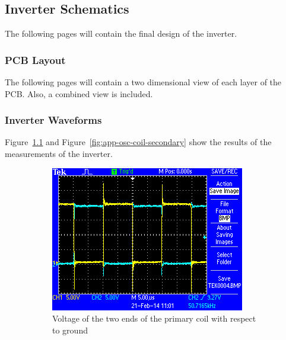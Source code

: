 \documentclass[11pt,titlepage]{report}
\begin{document}
\begin{appendices}
\chapter{Inverter Schematics}
\label{app:schematics}
The following pages will contain the final design of the inverter.

\subsection{PCB Layout}
\label{app:pcb_layout}
The following pages will contain a two dimensional view of each layer of the PCB. Also, a combined view is included.

\subsection{Inverter Waveforms}
Figure~\ref{fig:app-osc-coil-primary} and Figure~\ref{fig:app-osc-coil-secondary} show the results of the measurements of the inverter.
\label{app:waveforms}
\begin{figure}[H]
	\begin{center}
		\begin{subfigure}[h]{0.48\textwidth}
			\includegraphics[width=\textwidth]{resources/osc-coil-primary.png}
			\caption{Voltage of the two ends of the primary coil with respect to ground}
			\label{fig:app-osc-coil-primary}
		\end{subfigure}
		\quad
		\begin{subfigure}[h]{0.48\textwidth}

\end{subfigure}
\end{center}
\end{figure}
\end{appendices}
\end{document}
